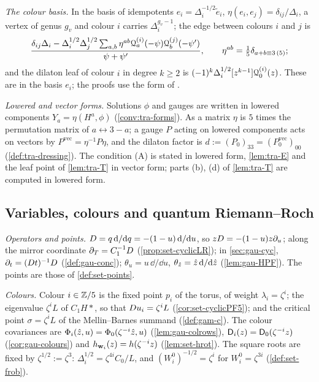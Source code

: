 \emph{The colour basis.} In the basis of idempotents $e_i=\Delta_i^{-1/2}\tilde e_i$, $\eta(e_i,e_j)=\delta_{ij}/\Delta_i$, a vertex of genus $g_v$ and colour $i$ carries $\Delta_i^{g_v-1}$; the edge between colours $i$ and $j$ is
\[
\frac{\delta_{ij}\Delta_i-\Delta_i^{1/2}\Delta_j^{1/2}\sum_{a,b}\eta^{ab}\mathcal{Q}^{(i)}_a(-\psi)\mathcal{Q}^{(j)}_b(-\psi')}{\psi+\psi'},\qquad\eta^{ab}=\tfrac15\delta_{a+b\equiv3\,(5)};
\]
and the dilaton leaf of colour $i$ in degree $k\geq2$ is $(-1)^k\Delta_i^{1/2}[z^{k-1}]\mathcal{Q}^{(i)}_0(z)$. These are \cite[Defs.~2.2, 2.13]{PPZ15} in the basis $e_i$; the proofs use the form of \cite{PPZ15}.

\emph{Lowered and vector forms.} Solutions $\phi$ and gauges are written in lowered components $Y_a=\eta(H^a,\phi)$ (\cref{conv:tra-forms}). As a matrix $\eta$ is $5$ times the permutation matrix of $a\leftrightarrow3-a$; a gauge $P$ acting on lowered components acts on vectors by $P^{\mathrm{vec}}=\eta^{-1}P\eta$, and the dilaton factor is $d:=(P_0)_{33}=(P_0^{\mathrm{vec}})_{00}$ (\cref{def:tra-dressing}). The condition (A) is stated in lowered form, \cref{lem:tra-E} and the leaf point of \cref{lem:tra-T} in vector form; parts (b), (d) of \cref{lem:tra-T} are computed in lowered form.

\subsection{Variables, colours and quantum Riemann--Roch}
\label{sec:sgn-var}

\emph{Operators and points.} $D=q\,\mathrm{d}/\mathrm{d} q=-(1-u)\,\mathrm{d}/\mathrm{d} u$, so $zD=-(1-u)z\partial_u$; along the mirror coordinate $\partial_T=C_1^{-1}D$ (\cref{prop:set-cyclicLR}); in \cref{sec:gau-cyc}, $\partial_t=(D t)^{-1}D$ (\cref{def:gau-conc}); $\theta_u=u\,\dd/\dd u$, $\theta_{\hat{z}}=\hat{z}\,\mathrm{d}/\mathrm{d}\hat{z}$ (\cref{lem:gau-HPF}). The points are those of \cref{def:set-points}.

\emph{Colours.} Colour $i\in\mathbb{Z}/5$ is the fixed point $p_i$ of the torus, of weight $\lambda_i=\zeta^i$; the eigenvalue $\zeta^iL$ of $C_1H*$, so that $D u_i=\zeta^iL$ (\cref{cor:set-cyclicPF5}); and the critical point $\sigma=\zeta^iL$ of the Mellin--Barnes summand (\cref{def:gam-c}). The colour covariances are $\Phi_i(\hat{z},u)=\Phi_0(\zeta^{-i}\hat{z},u)$ (\cref{lem:gau-colrows}), $\mathsf{D}_i(z)=\mathsf{D}_0(\zeta^{-i}z)$ (\cref{cor:gau-colours}) and $h_{\mathbf{w}_i}(z)=h(\zeta^{-i}z)$ (\cref{lem:set-hrot}). The square roots are fixed by $\zeta^{1/2}:=\zeta^3$: $\Delta_i^{1/2}=\zeta^{4i}C_0/L$, and $(W^0_i)^{-1/2}=\zeta^i$ for $W^0_i=\zeta^{3i}$ (\cref{def:set-frob}).

